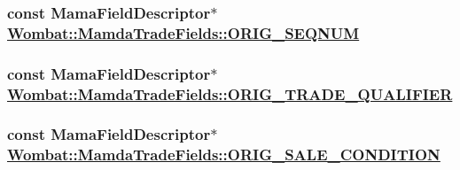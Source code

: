 \hypertarget{classWombat_1_1MamdaTradeFields_0dbe02df598d6a126ee49c5aaa8a05a4}{
\subsubsection[ORIG\_\-SEQNUM]{\setlength{\rightskip}{0pt plus 5cm}const Mama\-Field\-Descriptor$\ast$ \hyperlink{classWombat_1_1MamdaTradeFields_0dbe02df598d6a126ee49c5aaa8a05a4}{Wombat::Mamda\-Trade\-Fields::ORIG\_\-SEQNUM}}}
\label{classWombat_1_1MamdaTradeFields_0dbe02df598d6a126ee49c5aaa8a05a4}


\hypertarget{classWombat_1_1MamdaTradeFields_58662eb4c1d3561e04712a70e95eac48}{
\subsubsection[ORIG\_\-TRADE\_\-QUALIFIER]{\setlength{\rightskip}{0pt plus 5cm}const Mama\-Field\-Descriptor$\ast$ \hyperlink{classWombat_1_1MamdaTradeFields_58662eb4c1d3561e04712a70e95eac48}{Wombat::Mamda\-Trade\-Fields::ORIG\_\-TRADE\_\-QUALIFIER}}}
\label{classWombat_1_1MamdaTradeFields_58662eb4c1d3561e04712a70e95eac48}


\hypertarget{classWombat_1_1MamdaTradeFields_34ced09149ed0b1d8eb74c7c8a895393}{
\subsubsection[ORIG\_\-SALE\_\-CONDITION]{\setlength{\rightskip}{0pt plus 5cm}const Mama\-Field\-Descriptor$\ast$ \hyperlink{classWombat_1_1MamdaTradeFields_34ced09149ed0b1d8eb74c7c8a895393}{Wombat::Mamda\-Trade\-Fields::ORIG\_\-SALE\_\-CONDITION}}}
\label{classWombat_1_1MamdaTradeFields_34ced09149ed0b1d8eb74c7c8a895393}


